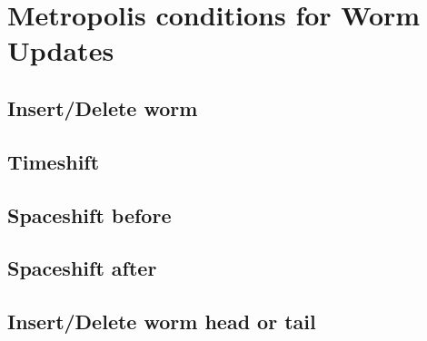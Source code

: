 \documentclass{article}
\begin{document}
\section{Metropolis conditions for Worm Updates}
	\subsection{Insert/Delete worm}
	\subsection{Timeshift}
	\subsection{Spaceshift before}
	\subsection{Spaceshift after}
	\subsection{Insert/Delete worm head or tail}
\end{document}
